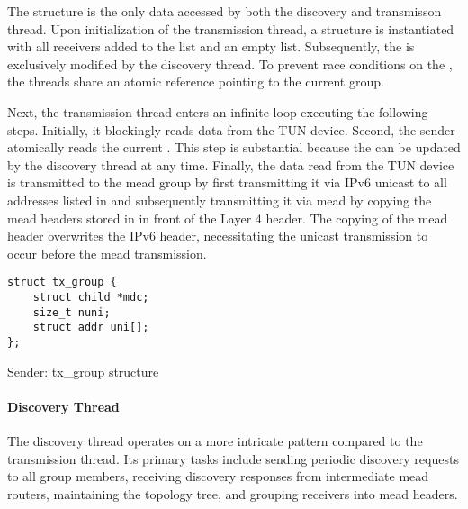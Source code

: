 The  structure is the only data accessed by both the
    discovery and transmisson thread.
Upon initialization of the transmission thread, a 
    structure is instantiated with all receivers added to the 
    list and an empty  list.
Subsequently, the  is exclusively modified by the discovery
    thread.
To prevent race conditions on the , the threads share an
    atomic reference pointing to the current group.

Next, the transmission thread enters an infinite loop executing the following
    steps.
Initially, it blockingly reads data from the TUN device.
Second, the sender atomically reads the current .
This step is substantial because the  can be updated by
    the discovery thread at any time.
Finally, the data read from the TUN device is transmitted to the \gls{mead} group
    by first transmitting it via IPv6 unicast to all addresses listed in
     and subsequently transmitting it via \gls{mead} by copying
    the \gls{mead} headers stored in  in front of the Layer 4
    header.
The copying of the \gls{mead} header overwrites the IPv6 header, necessitating
    the unicast transmission to occur before the \gls{mead} transmission.

\begin{listing}
\begin{verbatim}
struct tx_group {
    struct child *mdc;
    size_t nuni;
    struct addr uni[];
};
\end{verbatim}
    \caption{Sender: tx\_group structure}
    \label{lst:txg_struct}
\end{listing}


\paragraph{Discovery Thread} %
\label{par:Discovery Thread}

The discovery thread operates on a more intricate pattern compared to the
    transmission thread.
Its primary tasks include sending periodic discovery requests to all group
    members, receiving discovery responses from intermediate \gls{mead} routers,
    maintaining the topology tree, and grouping receivers into \gls{mead}
    headers.

